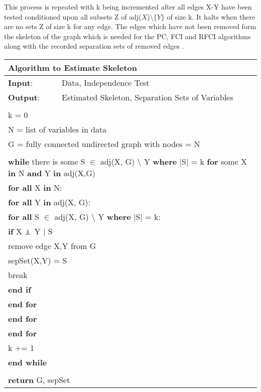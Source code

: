 \documentclass{article}
\newcommand\independent{\protect\mathpalette{\protect\independenT}{\perp}}
\def\independenT#1#2{\mathrel{\rlap{$#1#2$}\mkern2mu{#1#2}}}
\begin{document}
This process is repeated with k being incremented after all edges X-Y have been tested conditioned upon all subsets Z of adj($X$)$\setminus \{Y\}$ of size k. It halts when there are no sets Z of size k for any edge. The edges which have not been removed form the skeleton of the graph which is needed for the PC, FCI and RFCI algorithms along with the recorded separation sets of removed edges \cite{colombo2012learning, spirtes1991algorithm}.
\\

\begin{table}[h!]
	\begin{tabular}{|l l|}
		 \hline
		 \multicolumn{2}{|l|}{Algorithm to Estimate Skeleton}\\ 
		 \hline
		 \textbf{Input}: & Data, Independence Test\\
		 \textbf{Output}: & Estimated Skeleton, Separation Sets of Variables\\
		 &\\
		 \multicolumn{2}{|l|}{k = 0}\\
		 \multicolumn{2}{|l|}{N = list of variables in data}\\
		 \multicolumn{2}{|l|}{G = fully connected undirected graph with nodes = N}\\
		 &\\
		 \multicolumn{2}{|l|}{\textbf{while} there is some S $\in $ adj(X, G) $\setminus$ Y \textbf{where} $ | $S$ | $ = k \textbf{for} some X \textbf{in} N \textbf{and} Y \textbf{in} adj(X,G)}\\
		 \multicolumn{2}{|l|}{\quad\textbf{for all} X \textbf{in} N:}\\
		 \multicolumn{2}{|l|}{\quad\quad \textbf{for all} Y \textbf{in} adj(X, G):}\\
		 \multicolumn{2}{|l|}{\quad\quad\quad \textbf{for all} S $\in $ adj(X, G) $\setminus$ Y \textbf{where} $ | $S$ | $ = k:}\\
		 \multicolumn{2}{|l|}{\quad \quad \quad\quad \textbf{if} X $ \independent $ Y $ | $ S}\\
		 \multicolumn{2}{|l|}{\quad \quad \quad \quad\quad remove edge X,Y from G}\\
		 \multicolumn{2}{|l|}{\quad \quad \quad \quad\quad sepSet(X,Y) = S}\\
		 \multicolumn{2}{|l|}{\quad \quad \quad \quad\quad break}\\
		 \multicolumn{2}{|l|}{\quad \quad \quad\quad \textbf{end if}} \\
		 \multicolumn{2}{|l|}{\quad \quad\quad \textbf{end for}}\\
		 \multicolumn{2}{|l|}{\quad\quad \textbf{end for}}\\
		 \multicolumn{2}{|l|}{\quad\textbf{end for}}\\
		 \multicolumn{2}{|l|}{\quad k += 1}\\
		 \multicolumn{2}{|l|}{ \textbf{end while}}\\
		 &\\
		 \multicolumn{2}{|l|}{ \textbf{return} G, sepSet}\\
		 \hline
		 
	\end{tabular}
\end{table}
\end{document}
